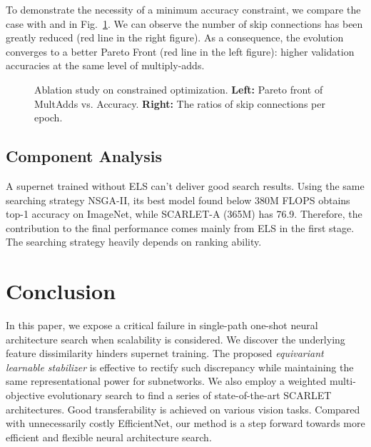 \documentclass[10pt,twocolumn,letterpaper]{article}
\theoremstyle{definition}
\begin{document}
To demonstrate the necessity of a minimum accuracy constraint, we compare the case with  and  in Fig.~\ref{fig:ablation-constraint}. We can observe the number of skip connections has been greatly reduced (red line in the right figure). As a consequence, the evolution converges to a better Pareto Front (red line in the left figure): higher validation accuracies at the same level of multiply-adds.

 \begin{figure}
\centering
{}
\caption{Ablation study on constrained optimization. \textbf{Left:} Pareto front of MultAdds vs. Accuracy.  \textbf{Right:} The ratios of skip connections per epoch.} \label{fig:ablation-constraint}
\end{figure}

\subsection{Component Analysis}
A supernet trained without ELS can't deliver good search results. Using the same searching strategy NSGA-II, its best model found below 380M FLOPS obtains  top-1 accuracy on ImageNet, while SCARLET-A (365M) has 76.9. Therefore, the contribution to the final performance comes mainly from ELS in the first stage. The searching strategy heavily depends on  ranking ability. 


\section{Conclusion}
In this paper, we expose a critical failure in single-path one-shot neural architecture search when scalability is considered. We discover the underlying feature dissimilarity hinders supernet training. The proposed \emph{equivariant learnable stabilizer} is effective to rectify such discrepancy while maintaining the same representational power for subnetworks. We also employ a weighted multi-objective evolutionary search to find a series of state-of-the-art SCARLET architectures. Good transferability is achieved on various vision tasks. Compared with unnecessarily costly EfficientNet, our method is a step forward towards more efficient and flexible neural architecture search. 

{\small


}

\newpage
\end{document}
